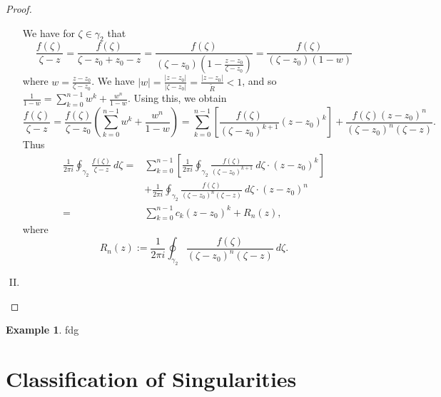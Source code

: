 \documentclass[12pt,openany]{book}
\theoremstyle{definition}
\newtheorem{example}{Example}[section]
\newcommand{\of}[1]{\left( #1 \right)}
\newcommand{\abs}[1]{\left\lvert #1 \right\rvert}
\begin{document}
\begin{proof}
\begin{enumerate}[(I)]
			We have for $\zeta\in\gamma_2$ that \[
			\frac{f(\zeta)}{\zeta-z}=\frac{f(\zeta)}{\zeta-z_0+z_0-z}=\frac{f(\zeta)}{(\zeta-z_0)\of{1-\frac{z-z_0}{\zeta-z_0}}}=\frac{f(\zeta)}{(\zeta-z_0)(1-w)}
			\] where $w=\frac{z-z_0}{\zeta-z_0}$. We have $\displaystyle\abs{w}=\frac{\abs{z-z_0}}{\abs{\zeta-z_0}}=\frac{\abs{z-z_0}}{\tilde{R}}<1$, and so $\displaystyle
			\frac{1}{1-w}=\sum_{k=0}^{n-1}w^{k}+\frac{w^n}{1-w}.
			$ Using this, we obtain \[
			\frac{f(\zeta)}{\zeta-z}=\frac{f(\zeta)}{\zeta-z_0}\of{\sum_{k=0}^{n-1}w^{k}+\frac{w^n}{1-w}}=\sum_{k=0}^{n-1}\left[\frac{f(\zeta)}{(\zeta-z_0)^{k+1}}(z-z_0)^k\right]+\frac{f(\zeta)(z-z_0)^n}{(\zeta-z_0)^n(\zeta-z)}.
			\] Thus \begin{align*}
			\frac{1}{2\pi i}\oint_{\gamma_2}\frac{f(\zeta)}{\zeta-z}\ d\zeta=&\sum_{k=0}^{n-1}\left[\frac{1}{2\pi i}\oint_{\gamma_2}\frac{f(\zeta)}{(\zeta-z_0)^{k+1}}\ d\zeta\cdot(z-z_0)^k\right]\\
			&+\frac{1}{2\pi i}\oint_{\gamma_2}\frac{f(\zeta)}{(\zeta-z_0)^n(\zeta-z)}\ d\zeta\cdot(z-z_0)^n\\
			=&\sum_{k=0}^{n-1}c_k(z-z_0)^k+R_n(z),
			\end{align*} where \[
			R_n(z):=\frac{1}{2\pi i}\oint_{\gamma_2}\frac{f(\zeta)}{(\zeta-z_0)^n(\zeta-z)}\ d\zeta.
			\]
			\item 
		\end{enumerate}
		
	\end{proof}
	\vspace{4pt}
	\begin{example}
		fdg
	\end{example}
	
	\newpage
	\section{Classification of Singularities}
	
\end{document}
